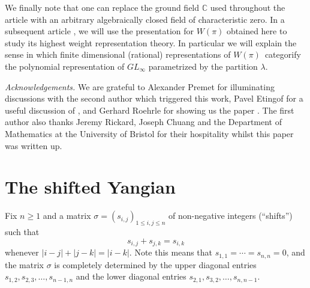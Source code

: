 \documentclass[twoside,12pt,reqno]{amsart}
\def\C{{\mathbb C}}
\begin{document}
We finally note that one can 
replace the ground field $\C$ used throughout the article 
with an arbitrary algebraically closed
field of characteristic zero.
In a subsequent article \cite{BK2}, we will use the
presentation for $W(\pi)$ obtained here to study its highest weight
representation theory. 
In particular we will explain the sense in which
finite dimensional (rational) representations of $W(\pi)$\
categorify the polynomial representation of $GL_{\infty}$ 
parametrized by the partition $\lambda$.


\vspace{2mm}
\noindent
{\em Acknowledgements.}
We are grateful to Alexander Premet for illuminating discussions
with the second author
which triggered this work, Pavel Etingof for a useful
discussion of \cite{RS}, and Gerhard Roehrle for showing us the paper
\cite{EK}.
The first author also thanks Jeremy Rickard,
Joseph Chuang and
the Department of Mathematics at the University of Bristol
for their hospitality whilst this paper was written up.


\section{The shifted Yangian}\label{syangian}

Fix $n \geq 1$ 
and a matrix $\sigma = (s_{i,j})_{1 \leq i,j \leq n}$ of
non-negative integers (``shifts'') such that
\begin{equation}\label{shiftcon}
s_{i,j} + s_{j,k} = s_{i,k}
\end{equation}
whenever $|i-j|+|j-k|=|i-k|$.
Note this means that $s_{1,1}=\cdots=s_{n,n} = 0$, and the
matrix $\sigma$ is completely determined by the 
upper diagonal entries
$s_{1,2}, s_{2,3},\dots,s_{n-1,n}$
and the lower diagonal entries
$s_{2,1}, s_{3,2},\dots,s_{n,n-1}$.
\end{document}
